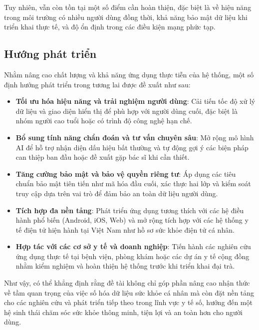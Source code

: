 Tuy nhiên, vẫn còn tồn tại một số điểm cần hoàn thiện, đặc biệt là về hiệu năng trong môi trường có nhiều người dùng đồng thời, khả năng bảo mật dữ liệu khi triển khai thực tế, và độ ổn định trong các điều kiện mạng phức tạp.

\subsection{Hướng phát triển}

Nhằm nâng cao chất lượng và khả năng ứng dụng thực tiễn của hệ thống, một số định hướng phát triển trong tương lai được đề xuất như sau:

\begin{itemize}
  \item \textbf{Tối ưu hóa hiệu năng và trải nghiệm người dùng}: Cải tiến tốc độ xử lý dữ liệu và giao diện hiển thị để phù hợp với người dùng cuối, đặc biệt là nhóm người cao tuổi hoặc có trình độ công nghệ hạn chế.
  
  \item \textbf{Bổ sung tính năng chẩn đoán và tư vấn chuyên sâu}: Mở rộng mô hình AI để hỗ trợ nhận diện dấu hiệu bất thường và tự động gợi ý các biện pháp can thiệp ban đầu hoặc đề xuất gặp bác sĩ khi cần thiết.
  
  \item \textbf{Tăng cường bảo mật và bảo vệ quyền riêng tư}: Áp dụng các tiêu chuẩn bảo mật tiên tiến như mã hóa đầu cuối, xác thực hai lớp và kiểm soát truy cập dựa trên vai trò để đảm bảo an toàn dữ liệu người dùng.
  
  \item \textbf{Tích hợp đa nền tảng}: Phát triển ứng dụng tương thích với các hệ điều hành phổ biến (Android, iOS, Web) và mở rộng tích hợp với các hệ thống y tế điện tử hiện hành tại Việt Nam như hồ sơ sức khỏe điện tử cá nhân.
  
  \item \textbf{Hợp tác với các cơ sở y tế và doanh nghiệp}: Tiến hành các nghiên cứu ứng dụng thực tế tại bệnh viện, phòng khám hoặc các dự án y tế cộng đồng nhằm kiểm nghiệm và hoàn thiện hệ thống trước khi triển khai đại trà.
\end{itemize}

Như vậy, có thể khẳng định rằng đề tài không chỉ góp phần nâng cao nhận thức về tầm quan trọng của việc số hóa dữ liệu sức khỏe cá nhân mà còn đặt nền tảng cho các nghiên cứu và phát triển tiếp theo trong lĩnh vực y tế số, hướng đến một hệ sinh thái chăm sóc sức khỏe thông minh, tiện lợi và an toàn hơn cho người dùng.
